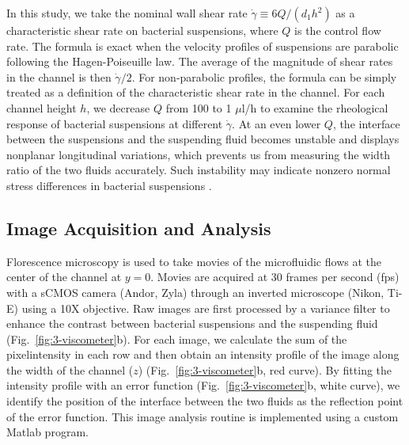 In this study, we take the nominal wall shear rate $\dot\gamma\equiv 6Q/(d_1h^2)$ as a characteristic shear rate on bacterial suspensions, where $Q$ is the control flow rate. The formula is exact when
the velocity profiles of suspensions are parabolic following the Hagen-Poiseuille law. The average of the magnitude of shear rates in the channel is then $\dot\gamma/2$. For non-parabolic profiles, the formula can be simply treated as a definition of the characteristic shear rate in the channel. For each channel height $h$, we decrease $Q$ from 100 to 1 $\mu$l/h to examine the
rheological response of bacterial suspensions at different $\dot\gamma$. At an even lower $Q$, the interface between the suspensions and the suspending fluid becomes unstable and displays nonplanar
longitudinal variations, which prevents us from measuring the width ratio of the two fluids accurately. Such instability may indicate nonzero normal stress differences in bacterial suspensions \cite{Hinch1992, Brady2002, Saintillan2010}.

\subsection{Image Acquisition and Analysis}
Florescence microscopy is used to take movies of the microfluidic flows at the center of the channel at $y = 0$. Movies are acquired at 30 frames per second (fps) with a sCMOS camera (Andor, Zyla) through an inverted microscope (Nikon, Ti-E) using a 10X objective. Raw images are first processed by a variance filter to enhance the contrast between bacterial suspensions and the suspending fluid
(Fig.~\ref{fig:3-viscometer}b). For each image, we calculate the sum of the pixelintensity in each row and then obtain an intensity profile of the image along the width of the channel ($z$) (Fig.~\ref{fig:3-viscometer}b, red curve). By fitting the intensity profile with an error function (Fig.~\ref{fig:3-viscometer}b, white curve), we identify the position of the interface between the two fluids as the reflection point of the error function. This image analysis routine is implemented using a custom Matlab program.

